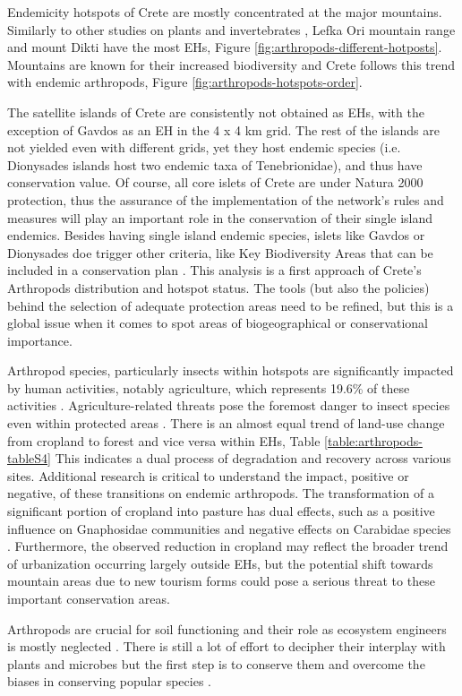 Endemicity hotspots of Crete are mostly concentrated at the major mountains. 
Similarly to other studies on plants \parencite{dimitrakopoulos2004questioning,kougioumoutzis2020plant}
and invertebrates \textcite{sfenthourakis2001hotspots},
Lefka Ori mountain range and mount Dikti have the most EHs, Figure \ref{fig:arthropods-different-hotposts}.
Mountains are known for their increased biodiversity  \parencite{antonelli2018geological, Rahbek2019} 
and Crete follows this trend with endemic arthropods, Figure \ref{fig:arthropods-hotspots-order}.

The satellite islands of Crete are consistently not obtained as EHs, with the exception of
Gavdos as an EH in the 4 x 4 km grid. The rest of the islands are not yielded
even with different grids, yet they host endemic species (i.e. Dionysades islands
host two endemic taxa of Tenebrionidae), and thus have conservation value.
Of course, all core islets of Crete are under Natura 2000 protection, thus the
assurance of the implementation of the network’s rules and measures will play an
important role in the conservation of their single island endemics.
Besides having single island endemic species, islets like Gavdos or Dionysades doe trigger
other criteria, like Key Biodiversity Areas that can be included in a conservation plan \parencite{farooq2023a-call}.
This analysis is a first approach of Crete’s Arthropods distribution and hotspot status.
The tools (but also the policies) behind the selection of adequate protection
areas need to be refined, but this is a global issue when it comes to spot areas
of biogeographical or conservational importance. 

Arthropod species, particularly insects within hotspots are significantly impacted
by human activities, notably agriculture, which represents 19.6\% of these activities \parencite{raven2021agricultural}.
Agriculture-related threats pose the foremost danger to insect species even within
protected areas \parencite{chowdhury2023protected}. There is an almost equal trend
of land-use change from cropland to forest and vice versa within EHs, Table \ref{table:arthropods-tableS4}
This indicates a dual process of degradation and recovery across various sites.
Additional research is critical to understand the impact, positive or negative, of these transitions on endemic arthropods.
The transformation of a significant portion of cropland into pasture has dual
effects, such as a positive influence on Gnaphosidae communities \parencite{kaltsas2019overgrazed}
and negative effects on Carabidae species \parencite{kaltsas2013ground}.
Furthermore, the observed reduction in cropland may reflect the broader trend
of urbanization occurring largely outside EHs, but the potential shift towards
mountain areas due to new tourism forms could pose a serious threat to these important conservation areas.

Arthropods are crucial for soil functioning and their role as ecosystem engineers 
is mostly neglected \parencite{COLEMAN2024131}. There is still a lot of effort to decipher their interplay 
with plants and microbes but the first step is to conserve them and overcome the 
biases in conserving popular species \parencite{mammola2020towards}.

